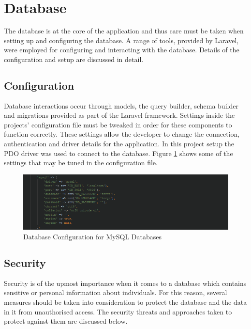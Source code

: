 \section{Database}
The database is at the core of the application and thus care must be taken when setting up and configuring the database. A range of tools, provided by Laravel, were employed for configuring and interacting with the database. Details of the configuration and setup are discussed in detail.

\subsection{Configuration}
Database interactions occur through models, the query builder, schema builder and migrations provided as part of the Laravel framework. Settings inside the projects' configuration file must be tweaked in order for these components to function correctly. These settings allow the developer to change the connection, authentication and driver details for the application. In this project setup the PDO driver was used to connect to the database. Figure \ref{fig:DatabaseConfig} shows some of the settings that may be tuned in the configuration file.

\begin{figure}[H]
	\centering
	\includegraphics[width=\textwidth]{Images/Implementation/MySQLConfig}
	\caption{Database Configuration for MySQL Databases} \label{fig:DatabaseConfig}
\end{figure}


\subsection{Security}
Security is of the upmost importance when it comes to a database which contains sensitive or personal information about individuals. For this reason, several measures should be taken into consideration to protect the database and the data in it from unauthorised access. The security threats and approaches taken to protect against them are discussed below.

